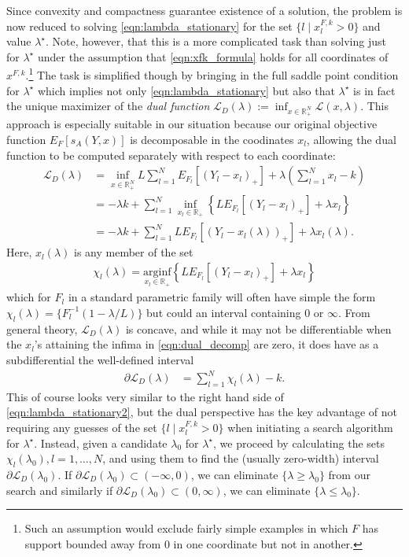 \documentclass{article}
\begin{document}
Since convexity and compactness guarantee existence of a solution, the problem is now reduced to solving \eqref{eqn:lambda_stationary} for the set 
$\{l \mid x_l^{F,k} > 0\}$ and value $\lambda^{\star}$. Note, however, that this is a more complicated task than solving just 
for $\lambda^{\star}$ under the assumption that \eqref{eqn:xfk_formula} holds for all coordinates of $x^{F,k}$.\footnote{Such an assumption would exclude fairly simple examples in which $F$ has support bounded away from $0$ in one coordinate but not in another.} The task is simplified though by bringing in the full saddle point condition for $\lambda^{\star}$ which implies not only \eqref{eqn:lambda_stationary} but also that
$\lambda^{\star}$ is in fact the unique maximizer of the \emph{dual function} 
$\mathcal{L}_D(\lambda) := \inf_{x \in \mathbb{R}_{+}^N} \mathcal{L}(x, \lambda)$.
This approach is especially suitable in our situation because our original objective function $E_F\left[s_A(Y,x)\right]$ is decomposable in the coodinates $x_l$, allowing the dual function to be computed separately with respect to each coordinate:
\begin{align}
\mathcal{L}_D(\lambda) &= \inf_{x \in \mathbb{R}_{+}^N} L\sum_{l=1}^{N} E_{F_l}[(Y_l - x_l)_{+}] + \lambda\left(\sum_{l=1}^{N} x_l - k\right) \\
&= - \lambda k + \sum_{l=1}^{N} \inf_{x_l \in \mathbb{R}_{+}}\left\{ L E_{F_l}[(Y_l - x_l)_{+}] + \lambda x_l\right\}  \label{eqn:dual_decomp} \\
&= - \lambda k + \sum_{l=1}^{N}  LE_{F_l}[(Y_l - x_l(\lambda))_{+}] + \lambda x_l(\lambda).
\end{align}
Here, $x_l(\lambda)$ is any member of the set 
\begin{align}
\chi_l(\lambda) = \underset{x_l \in \mathbb{R}_{+}}{\mathrm{arginf}} \left\{ L E_{F_l}[(Y_l - x_l)_{+}] + \lambda x_l\right\}
\end{align}
which for $F_l$ in a standard parametric family will often have simple the form $\chi_l(\lambda) = \{F_l^{-1}(1-\lambda/L)\}$ but could an interval containing $0$ or $\infty$.
From general theory, $\mathcal{L}_D(\lambda)$ is concave, and while it may not be differentiable when the $x_l$'s attaining the infima in \eqref{eqn:dual_decomp} are zero, it does have as a subdifferential the well-defined interval
\begin{align}
\partial \mathcal{L}_D(\lambda) 
&= \sum_{l=1}^N \chi_l(\lambda) - k.
\end{align}
This of course looks very similar to the right hand side of \eqref{eqn:lambda_stationary2}, but the dual perspective has the key advantage of not requiring any guesses of the set $\{l \mid x_l^{F,k} > 0\}$ when initiating a search algorithm for $\lambda^{\star}$.  Instead, given a candidate $\lambda_0$ for $\lambda^{\star}$, we proceed by calculating the sets $\chi_l(\lambda_0), l = 1,\ldots,N$, and using them to find the (usually zero-width) interval $\partial \mathcal{L}_D(\lambda_0)$. If $\partial \mathcal{L}_D(\lambda_0) \subset (-\infty,0)$, we can eliminate $\{\lambda \geq \lambda_0\}$ from our search and similarly if $\partial \mathcal{L}_D(\lambda_0) \subset (0, \infty)$, we can eliminate $\{\lambda \leq \lambda_0\}$. 
\end{document}
